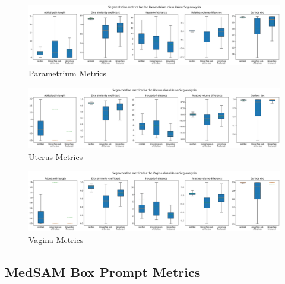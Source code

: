 \documentclass[12pt,twoside]{report}
\begin{document}
\begin{landscape}
  \begin{figure}[H]
    \centering
    \includegraphics[width=\linewidth]{../../research/source/code/data/metrics/metricsparametrium_1_combinednotable_UniverSeg_analysis.png}
    \caption{Parametrium Metrics}\label{fig:universeg-metrics-parametrium}
  \end{figure}

  \begin{figure}[H]
    \centering
    \includegraphics[width=\linewidth]{../../research/source/code/data/metrics/metricsuterus_1_combinednotable_UniverSeg_analysis.png}
    \caption{Uterus Metrics}\label{fig:universeg-metrics-uterus}
  \end{figure}

  \begin{figure}[H]
    \centering
    \includegraphics[width=\linewidth]{../../research/source/code/data/metrics/metricsvagina_1_combinednotable_UniverSeg_analysis.png}
    \caption{Vagina Metrics}\label{fig:universeg-metrics-vagina}
  \end{figure}

\end{landscape}

\subsection{MedSAM Box Prompt Metrics}\label{sect:medsam-appendix}
\end{document}
